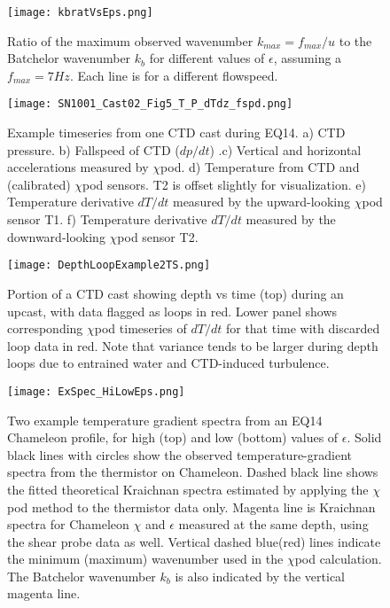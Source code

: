 \documentclass{ametsoc}
\begin{document}
\begin{figure}[t]
  \noindent\texttt{[image: kbratVsEps.png]}\\
  \caption{Ratio of the maximum observed wavenumber $k_{max}=f_{max}/u$ to the Batchelor wavenumber $k_b$ for different values of $\epsilon$, assuming a $f_{max}=7Hz$. Each line is for a different flowspeed.}
  \label{kbratVseps}
\end{figure}



\begin{figure}[t]
  \noindent\texttt{[image: SN1001\_Cast02\_Fig5\_T\_P\_dTdz\_fspd.png]}\\
  \caption{Example timeseries from one CTD cast during EQ14. a) CTD pressure. b) Fallspeed of CTD ($dp/dt$) .c) Vertical and horizontal accelerations measured by $\chi$pod. d) Temperature from CTD and (calibrated) $\chi$pod sensors. T2 is offset slightly for visualization. e) Temperature derivative $dT/dt$ measured by the upward-looking $\chi$pod sensor T1. f) Temperature derivative $dT/dt$ measured by the downward-looking $\chi$pod sensor T2.}
  \label{f2}
\end{figure}

\begin{figure}[t]
  \noindent\texttt{[image: DepthLoopExample2TS.png]}\\
  \caption{Portion of a CTD cast showing depth vs time (top) during an upcast, with data flagged as loops in red. Lower panel shows corresponding $\chi$pod timeseries of $dT/dt$ for that time with discarded loop data in red. Note that variance tends to be larger during depth loops due to entrained water and CTD-induced turbulence.}
  \label{depthloops2}
\end{figure}


\begin{figure}[t]
  \noindent\texttt{[image: ExSpec\_HiLowEps.png]}\\
  \caption{Two example temperature gradient spectra from an EQ14 Chameleon profile, for high (top) and low (bottom) values of $\epsilon$. Solid black lines with circles show the observed temperature-gradient spectra from the thermistor on Chameleon. Dashed black line shows the fitted theoretical Kraichnan spectra estimated by applying the $\chi$pod method to the thermistor data only. Magenta line is Kraichnan spectra for Chameleon $\chi$ and $\epsilon$ measured at the same depth, using the shear probe data as well. Vertical dashed blue(red) lines indicate the minimum (maximum) wavenumber used in the $\chi$pod calculation. The Batchelor wavenumber $k_b$ is also indicated by the vertical magenta line.}
  \label{specexamp}
\end{figure}
\end{document}
